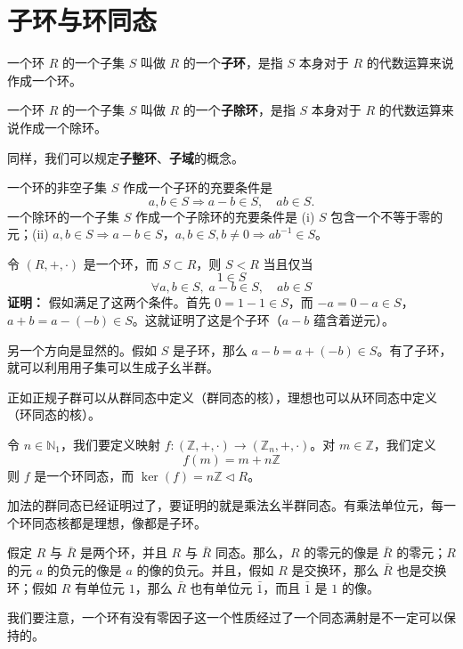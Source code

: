\section{子环与环同态}

\begin{definition}[子环与子除环]
一个环 $R$ 的一个子集 $S$ 叫做 $R$ 的一个\textbf{子环}，是指 $S$ 本身对于 $R$ 的代数运算来说作成一个环。

一个环 $R$ 的一个子集 $S$ 叫做 $R$ 的一个\textbf{子除环}，是指 $S$ 本身对于 $R$ 的代数运算来说作成一个除环。

同样，我们可以规定\textbf{子整环}、\textbf{子域}的概念。

一个环的非空子集 $S$ 作成一个子环的充要条件是
\[
a,b\in S\Rightarrow a-b\in S,\quad ab\in S.
\]
一个除环的一个子集 $S$ 作成一个子除环的充要条件是 (i) $S$ 包含一个不等于零的元；(ii) $a,b\in S\Rightarrow a-b\in S$，$a,b\in S,b\ne 0\Rightarrow ab^{-1}\in S$。
\end{definition}

\begin{lemma}[引理 2.1：子环等价条件]
令 $(R,+,\cdot)$ 是一个环，而 $S\subset R$，则 $S<R$ 当且仅当
\[
1\in S
\]
\[
\forall a,b\in S,\;a-b\in S,\quad ab\in S
\]
\textbf{证明：} 假如满足了这两个条件。首先 $0=1-1\in S$，而 $-a=0-a\in S$，$a+b=a-(-b)\in S$。这就证明了这是个子环（$a-b$ 蕴含着逆元）。

另一个方向是显然的。假如 $S$ 是子环，那么 $a-b=a+(-b)\in S$。有了子环，就可以利用用子集可以生成子幺半群。
\end{lemma}

\begin{lemma}[引理 2.3：理想可以从环同态中定义]
正如正规子群可以从群同态中定义（群同态的核），理想也可以从环同态中定义（环同态的核）。

令 $n\in\mathbb{N}_1$，我们要定义映射 $f:(\mathbb{Z},+,\cdot)\to(\mathbb{Z}_n,+,\cdot)$。对 $m\in\mathbb{Z}$，我们定义
\[
f(m)=m+n\mathbb{Z}
\]
则 $f$ 是一个环同态，而 $\ker(f)=n\mathbb{Z}\triangleleft R$。

加法的群同态已经证明过了，要证明的就是乘法幺半群同态。有乘法单位元，每一个环同态核都是理想，像都是子环。
\end{lemma}

\begin{theorem}
假定 $R$ 与 $\bar{R}$ 是两个环，并且 $R$ 与 $\bar{R}$ 同态。那么，$R$ 的零元的像是 $\bar{R}$ 的零元；$R$ 的元 $a$ 的负元的像是 $a$ 的像的负元。并且，假如 $R$ 是交换环，那么 $\bar{R}$ 也是交换环；假如 $R$ 有单位元 $1$，那么 $\bar{R}$ 也有单位元 $\bar{1}$，而且 $\bar{1}$ 是 $1$ 的像。

我们要注意，一个环有没有零因子这一个性质经过了一个同态满射是不一定可以保持的。
\end{theorem}

